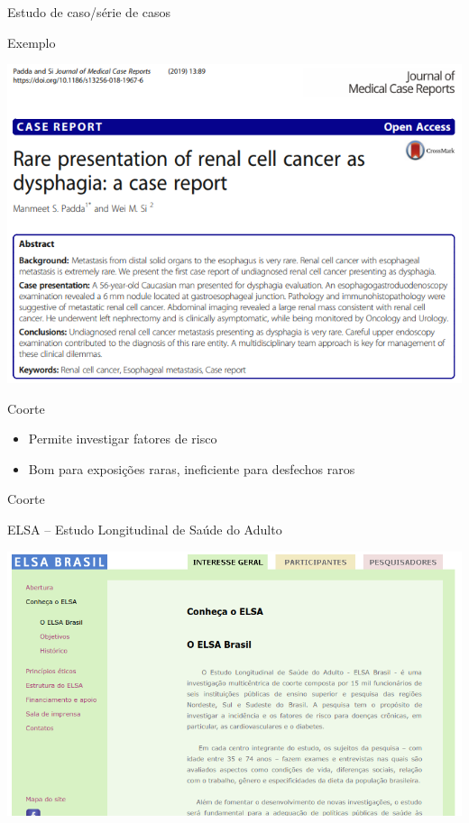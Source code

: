 \documentclass{beamer}
\begin{document}
\begin{frame}{Estudo de caso/série de casos}
  \begin{exampleblock}{Exemplo}
    \begin{center}
      \includegraphics[width=.9\textwidth]{Metodos/exemplo-casereport}
    \end{center}
  \end{exampleblock}
\end{frame}

\begin{frame}{Coorte}
  \begin{itemize}
    \small
  \item Permite investigar fatores de risco
    \bigskip
  \item Bom para exposições raras, ineficiente para desfechos raros
  \end{itemize}
\end{frame}

\begin{frame}{Coorte}
  \begin{exampleblock}{{\footnotesize ELSA -- Estudo Longitudinal de Saúde do Adulto}}
    \begin{center}
      \includegraphics[width=.9\textwidth]{Metodos/coorte-ELSA}
    \end{center}
  \end{exampleblock}
\end{frame}
\end{document}
